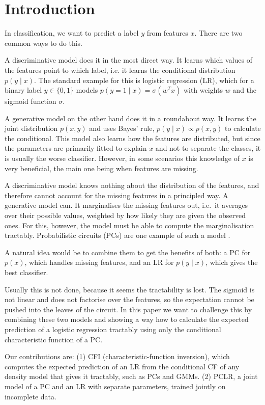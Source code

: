 \section{Introduction}
\label{sec:introduction}

In classification, we want to predict a label $y$ from features $x$. There are two common ways to do this.

A discriminative model does it in the most direct way. It learns which values of the features point to which label, i.e. it learns the conditional distribution $p(y \mid x)$.
The standard example for this is logistic regression (LR), which for a binary label $y \in \{0, 1\}$ models $p(y{=}1 \mid x) = \sigma(w^T x)$ with weights $w$ and the sigmoid function $\sigma$.

A generative model on the other hand does it in a roundabout way. It learns the joint distribution $p(x, y)$ and uses Bayes' rule, 
$p(y \mid x) \propto p(x, y)$ to calculate the conditional.
This model also learns how the features are distributed, but since the parameters are primarily fitted to explain $x$ and not to separate the classes, it is usually the worse classifier. %
However, in some scenarios this knowledge of $x$ is very beneficial, the main one being when features are missing.

A discriminative model knows nothing about the distribution of the features, and therefore cannot account for the missing features in a principled way.
A generative model can. It marginalises the missing features out, i.e.\ it averages over their possible values, weighted by how likely they are given the observed ones.
For this, however, the model must be able to compute the marginalisation tractably.
Probabilistic circuits (PCs) are one example of such a model \citep{pc_intro}.

A natural idea would be to combine them to get the benefits of both: a PC for $p(x)$, which handles missing features, 
and an LR for $p(y \mid x)$, which gives the best classifier.

Usually this is not done, because it seems the tractability is lost.
The sigmoid is not linear and does not factorise over the features, so the expectation cannot be pushed into the leaves of the circuit.
In this paper we want to challenge this by combining these two models and showing a way how 
to calculate the expected prediction of a logistic regression tractably using only the conditional characteristic function of a PC.

Our contributions are:
(1) CFI (characteristic-function inversion), which computes the expected prediction of an LR from the conditional CF of any density model that gives it tractably, such as PCs and GMMs.
(2) PCLR, a joint model of a PC and an LR with separate parameters, trained jointly on incomplete data.

